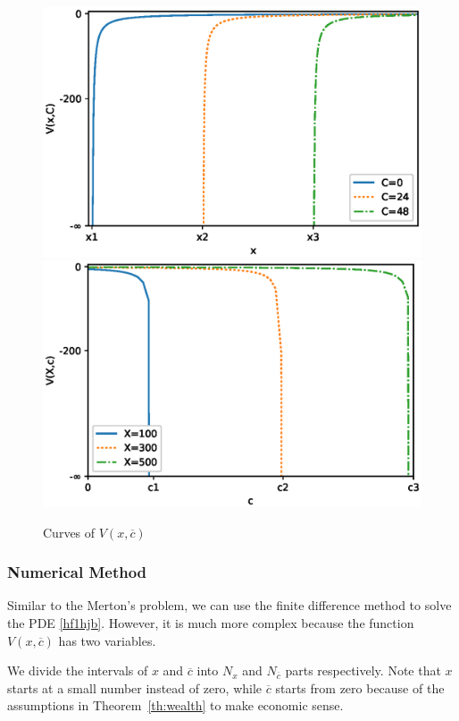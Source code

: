 \documentclass[a4paper]{article}
\theoremstyle{definition}
\numberwithin{equation}{section}
\begin{document}
\begin{figure}[H]
\centering
\includegraphics[scale=0.45]{HFcompareVx.eps}
\includegraphics[scale=0.45]{HFcompareVc.eps}
\caption{Curves of $V(x,\overline c)$}
\label{fig:CompareV}
\end{figure}

\subsubsection{Numerical Method}
Similar to the Merton's problem, we can use the finite difference method to solve the PDE \eqref{hf1hjb}. However, it is much more complex because the function $V(x,\overline c)$ has two variables.

We divide the intervals of $x$ and $\overline c$ into $N_x$ and $N_{\overline c}$ parts respectively. Note that $x$ starts at a small number instead of zero, while $\overline c$ starts from zero because of the assumptions in Theorem~\ref{th:wealth} to make economic sense.
\end{document}
